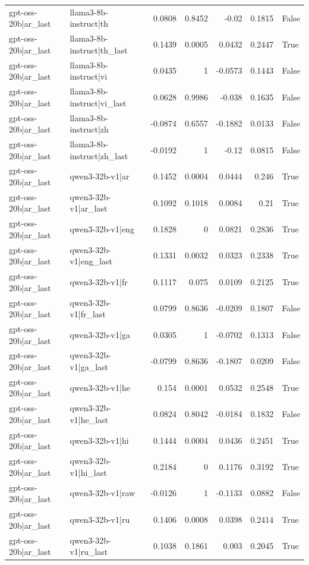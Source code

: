 \begin{table}
\begin{tabular}{l l r r r r l}
gpt-oss-20b|ar_last & llama3-8b-instruct|th & 0.0808 & 0.8452 & -0.02 & 0.1815 & False \\
gpt-oss-20b|ar_last & llama3-8b-instruct|th_last & 0.1439 & 0.0005 & 0.0432 & 0.2447 & True \\
gpt-oss-20b|ar_last & llama3-8b-instruct|vi & 0.0435 & 1 & -0.0573 & 0.1443 & False \\
gpt-oss-20b|ar_last & llama3-8b-instruct|vi_last & 0.0628 & 0.9986 & -0.038 & 0.1635 & False \\
gpt-oss-20b|ar_last & llama3-8b-instruct|zh & -0.0874 & 0.6557 & -0.1882 & 0.0133 & False \\
gpt-oss-20b|ar_last & llama3-8b-instruct|zh_last & -0.0192 & 1 & -0.12 & 0.0815 & False \\
gpt-oss-20b|ar_last & qwen3-32b-v1|ar & 0.1452 & 0.0004 & 0.0444 & 0.246 & True \\
gpt-oss-20b|ar_last & qwen3-32b-v1|ar_last & 0.1092 & 0.1018 & 0.0084 & 0.21 & True \\
gpt-oss-20b|ar_last & qwen3-32b-v1|eng & 0.1828 & 0 & 0.0821 & 0.2836 & True \\
gpt-oss-20b|ar_last & qwen3-32b-v1|eng_last & 0.1331 & 0.0032 & 0.0323 & 0.2338 & True \\
gpt-oss-20b|ar_last & qwen3-32b-v1|fr & 0.1117 & 0.075 & 0.0109 & 0.2125 & True \\
gpt-oss-20b|ar_last & qwen3-32b-v1|fr_last & 0.0799 & 0.8636 & -0.0209 & 0.1807 & False \\
gpt-oss-20b|ar_last & qwen3-32b-v1|ga & 0.0305 & 1 & -0.0702 & 0.1313 & False \\
gpt-oss-20b|ar_last & qwen3-32b-v1|ga_last & -0.0799 & 0.8636 & -0.1807 & 0.0209 & False \\
gpt-oss-20b|ar_last & qwen3-32b-v1|he & 0.154 & 0.0001 & 0.0532 & 0.2548 & True \\
gpt-oss-20b|ar_last & qwen3-32b-v1|he_last & 0.0824 & 0.8042 & -0.0184 & 0.1832 & False \\
gpt-oss-20b|ar_last & qwen3-32b-v1|hi & 0.1444 & 0.0004 & 0.0436 & 0.2451 & True \\
gpt-oss-20b|ar_last & qwen3-32b-v1|hi_last & 0.2184 & 0 & 0.1176 & 0.3192 & True \\
gpt-oss-20b|ar_last & qwen3-32b-v1|raw & -0.0126 & 1 & -0.1133 & 0.0882 & False \\
gpt-oss-20b|ar_last & qwen3-32b-v1|ru & 0.1406 & 0.0008 & 0.0398 & 0.2414 & True \\
gpt-oss-20b|ar_last & qwen3-32b-v1|ru_last & 0.1038 & 0.1861 & 0.003 & 0.2045 & True \\

\end{tabular}
\end{table}
